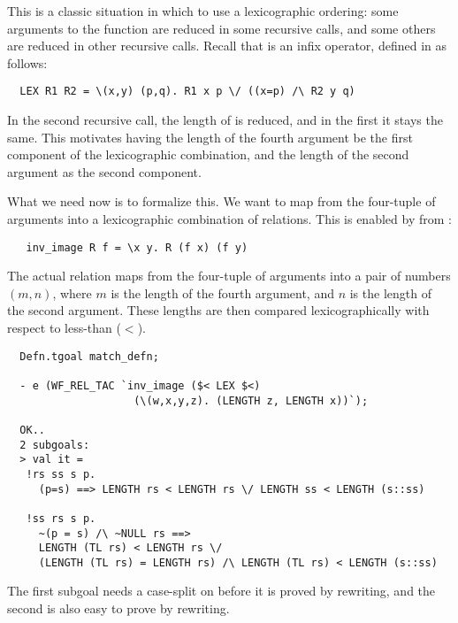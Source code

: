 This is a classic situation in which to use a lexicographic ordering:
some arguments to the function are reduced in some recursive calls, and
some others are reduced in other recursive calls.  Recall that  is
an infix operator, defined in  as follows:
%
\begin{hol}
\begin{verbatim}
  LEX R1 R2 = \(x,y) (p,q). R1 x p \/ ((x=p) /\ R2 y q)
\end{verbatim}
\end{hol}
%
In the second recursive call, the length of  is reduced, and in
the first it stays the same. This motivates having the length of the
fourth argument be the first component of the lexicographic
combination, and the length of the second argument as the second
component.

What we need now is to formalize this. We want to map from the
four-tuple of arguments into a lexicographic combination of
relations. This is enabled by  from :
%
\begin{hol}
\begin{verbatim}
   inv_image R f = \x y. R (f x) (f y)
\end{verbatim}
\end{hol}
%
The actual relation maps from the four-tuple of arguments into a pair
of numbers $(m,n)$, where $m$ is the length of the fourth argument, and
$n$ is the length of the second argument. These lengths are then
compared lexicographically with respect to less-than ($<$).
\begin{session}
\begin{hol}
\begin{verbatim}
  Defn.tgoal match_defn;

  - e (WF_REL_TAC `inv_image ($< LEX $<)
                    (\(w,x,y,z). (LENGTH z, LENGTH x))`);

  OK..
  2 subgoals:
  > val it =
   !rs ss s p. 
     (p=s) ==> LENGTH rs < LENGTH rs \/ LENGTH ss < LENGTH (s::ss)
    
   !ss rs s p.
     ~(p = s) /\ ~NULL rs ==>
     LENGTH (TL rs) < LENGTH rs \/
     (LENGTH (TL rs) = LENGTH rs) /\ LENGTH (TL rs) < LENGTH (s::ss)
\end{verbatim}
\end{hol}
\end{session}
%
The first subgoal needs a case-split on  before it is proved by
rewriting, and the second is also easy to prove by rewriting.

